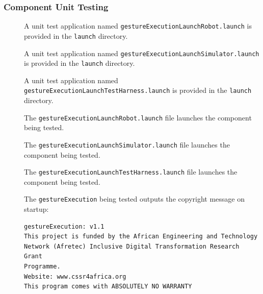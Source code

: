 \documentclass{CSSRforAfrica}
\newcommand{\checkboxChecked}{\fbox{\ding{51}}} %
\newcommand{\checkboxDashed}{\fbox{--}}         %
\begin{document}
\subsubsection{Component Unit Testing}
\label{subsubsection:gesture_execution_unit_testing}



\begin{description}
\item[\checkboxDashed] A unit test application named {\small \verb+gestureExecutionLaunchRobot.launch+} is provided in the {\small \verb+launch+} directory. 

\item[\checkboxDashed] A unit test application named {\small \verb+gestureExecutionLaunchSimulator.launch+} is provided in the {\small \verb+launch+} directory. 

\item[\checkboxDashed] A unit test application named {\small \verb+gestureExecutionLaunchTestHarness.launch+} is provided in the {\small \verb+launch+} directory. 

\item[\checkboxDashed] The {\small \verb+gestureExecutionLaunchRobot.launch+} file  launches the component being tested.

\item[\checkboxDashed] The {\small \verb+gestureExecutionLaunchSimulator.launch+} file  launches the component being tested.

\item[\checkboxDashed] The {\small \verb+gestureExecutionLaunchTestHarness.launch+} file  launches the component being tested.

\item[\checkboxChecked]  The {\small \verb+gestureExecution+} being tested outputs the copyright message on startup:
\begin{verbatim}
gestureExecution: v1.1
This project is funded by the African Engineering and Technology
Network (Afretec) Inclusive Digital Transformation Research Grant
Programme.
Website: www.cssr4africa.org
This program comes with ABSOLUTELY NO WARRANTY
\end{verbatim}


\end{description}
\end{document}
